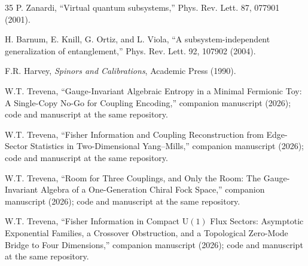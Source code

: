 \documentclass[11pt]{article}
\begin{document}
\begin{thebibliography}{35}
 P. Zanardi, ``Virtual quantum subsystems,'' Phys. Rev. Lett. 87, 077901 (2001).

 H. Barnum, E. Knill, G. Ortiz, and L. Viola, ``A subsystem-independent generalization of entanglement,'' Phys. Rev. Lett. 92, 107902 (2004).

 F.R. Harvey, \emph{Spinors and Calibrations}, Academic Press (1990).

 W.T. Trevena, ``Gauge-Invariant Algebraic Entropy in a Minimal Fermionic Toy: A Single-Copy No-Go for Coupling Encoding,'' companion manuscript (2026); code and manuscript at the same repository.

 W.T. Trevena, ``Fisher Information and Coupling Reconstruction from Edge-Sector Statistics in Two-Dimensional Yang--Mills,'' companion manuscript (2026); code and manuscript at the same repository.

 W.T. Trevena, ``Room for Three Couplings, and Only the Room: The Gauge-Invariant Algebra of a One-Generation Chiral Fock Space,'' companion manuscript (2026); code and manuscript at the same repository.

 W.T. Trevena, ``Fisher Information in Compact $\mathrm{U}(1)$ Flux Sectors: Asymptotic Exponential Families, a Crossover Obstruction, and a Topological Zero-Mode Bridge to Four Dimensions,'' companion manuscript (2026); code and manuscript at the same repository.

\end{thebibliography}
\end{document}
